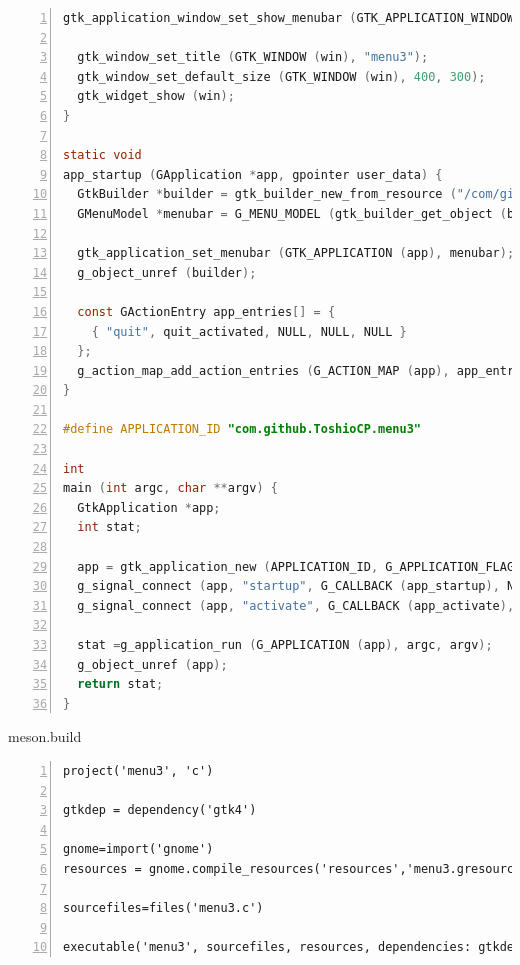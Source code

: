 \begin{lstlisting}[language=C, numbers=left]
  gtk_application_window_set_show_menubar (GTK_APPLICATION_WINDOW (win), TRUE);

  gtk_window_set_title (GTK_WINDOW (win), "menu3");
  gtk_window_set_default_size (GTK_WINDOW (win), 400, 300);
  gtk_widget_show (win);
}

static void
app_startup (GApplication *app, gpointer user_data) {
  GtkBuilder *builder = gtk_builder_new_from_resource ("/com/github/ToshioCP/menu3/menu3.ui");
  GMenuModel *menubar = G_MENU_MODEL (gtk_builder_get_object (builder, "menubar"));

  gtk_application_set_menubar (GTK_APPLICATION (app), menubar);
  g_object_unref (builder);

  const GActionEntry app_entries[] = {
    { "quit", quit_activated, NULL, NULL, NULL }
  };
  g_action_map_add_action_entries (G_ACTION_MAP (app), app_entries, G_N_ELEMENTS (app_entries), app);
}

#define APPLICATION_ID "com.github.ToshioCP.menu3"

int
main (int argc, char **argv) {
  GtkApplication *app;
  int stat;

  app = gtk_application_new (APPLICATION_ID, G_APPLICATION_FLAGS_NONE);
  g_signal_connect (app, "startup", G_CALLBACK (app_startup), NULL);
  g_signal_connect (app, "activate", G_CALLBACK (app_activate), NULL);

  stat =g_application_run (G_APPLICATION (app), argc, argv);
  g_object_unref (app);
  return stat;
}
\end{lstlisting}

meson.build

\begin{lstlisting}[numbers=left]
project('menu3', 'c')

gtkdep = dependency('gtk4')

gnome=import('gnome')
resources = gnome.compile_resources('resources','menu3.gresource.xml')

sourcefiles=files('menu3.c')

executable('menu3', sourcefiles, resources, dependencies: gtkdep)
\end{lstlisting}
